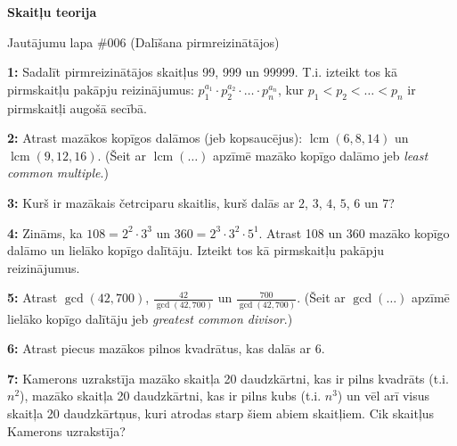 \documentclass[11pt]{article}
\newenvironment{uzdevums}[1][\unskip]{%
\vspace{3mm}
\noindent
\textbf{#1:}
\noindent}
{}
\begin{document}
\begin{center}
{\LARGE \bf Skaitļu teorija}
\end{center}

\begin{center}
{\large Jautājumu lapa \#006 (Dalīšana pirmreizinātājos)}
\end{center}


\begin{uzdevums}[1]
Sadalīt pirmreizinātājos skaitļus 99, 999 un 99999. T.i. izteikt tos kā pirmskaitļu pakāpju
reizinājumus: $p_1^{a_1} \cdot p_2^{a_2} \cdot \ldots \cdot p_n^{a_n}$, kur
$p_1 < p_2 < \ldots < p_n$ ir pirmskaitļi augošā secībā.
\end{uzdevums}


\begin{uzdevums}[2]
Atrast mazākos kopīgos dalāmos (jeb kopsaucējus): $\operatorname{lcm}(6,8,14)$ un 
$\operatorname{lcm}(9,12,16)$. (Šeit ar $\operatorname{lcm}(\ldots)$ apzīmē 
mazāko kopīgo dalāmo jeb {\em least common multiple}.)
\end{uzdevums}

\begin{uzdevums}[3]
Kurš ir mazākais četrciparu skaitlis, kurš dalās ar 
$2$, $3$, $4$, $5$, $6$ un $7$?
\end{uzdevums}

\begin{uzdevums}[4]
Zināms, ka $108 = 2^2 \cdot 3^3$ un $360 = 2^3 \cdot 3^2 \cdot 5^1$. 
Atrast 108 un 360 mazāko kopīgo dalāmo un lielāko kopīgo dalītāju. 
Izteikt tos kā pirmskaitļu pakāpju reizinājumus. 
\end{uzdevums}

\begin{uzdevums}[5]
Atrast $\gcd(42, 700)$, $\frac{42}{\gcd(42, 700)}$ un $\frac{700}{\gcd(42, 700)}$. 
(Šeit ar $\operatorname{gcd}(\ldots)$ apzīmē 
lielāko kopīgo dalītāju jeb {\em greatest common divisor}.)
\end{uzdevums}

\begin{uzdevums}[6]
Atrast piecus mazākos pilnos kvadrātus, kas dalās ar $6$.
\end{uzdevums}

\begin{uzdevums}[7]
Kamerons uzrakstīja mazāko skaitļa 20 daudzkārtni, kas ir pilns kvadrāts (t.i. $n^2$), 
mazāko skaitļa 20 daudzkārtni, kas ir pilns kubs (t.i. $n^3$) un vēl arī 
visus skaitļa 20 daudzkārtņus, kuri atrodas starp šiem abiem skaitļiem. 
Cik skaitļus Kamerons uzrakstīja? 
\end{uzdevums}
\end{document}
